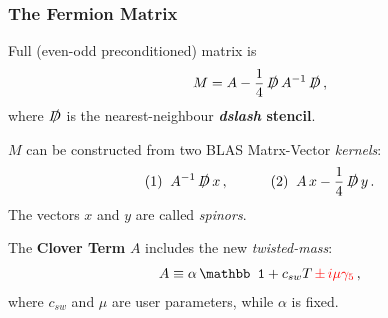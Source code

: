 \documentclass{beamer}
\begin{document}
  \begin{frame}
    \frametitle{The Fermion Matrix}
    Full (even-odd preconditioned) matrix is
    \begin{align*}
      M = A - \frac 14 \, \slashed D \, A^{-1} \, \slashed D \,,
    \end{align*}
    where $\slashed D$ is the nearest-neighbour \textbf{\textit{dslash} stencil}.
    \vfill

    $M$ can be constructed from two BLAS Matrx-Vector \textit{kernels}:
    \begin{align*}
      (1) \;\; A^{-1} \, \slashed D \, x \,, \quad \quad \quad
      (2) \;\; A \, x - \frac 14 \, \slashed D \, y \,.
    \end{align*}
    The vectors $x$ and $y$ are called \textit{spinors}.
    \vfill

    The \textbf{Clover Term} $A$ includes the {\color{red} new} \textit{twisted-mass}:
    \begin{align*}
      A \equiv
      \alpha \, \mathbb 1
      + c_{sw} T
      {\color{red} \, \pm \, i \mu \gamma_5} \,,
    \end{align*}
    where $c_{sw}$ and $\mu$ are user parameters, while $\alpha$ is fixed.
    \vfill
  \end{frame}

\end{document}
